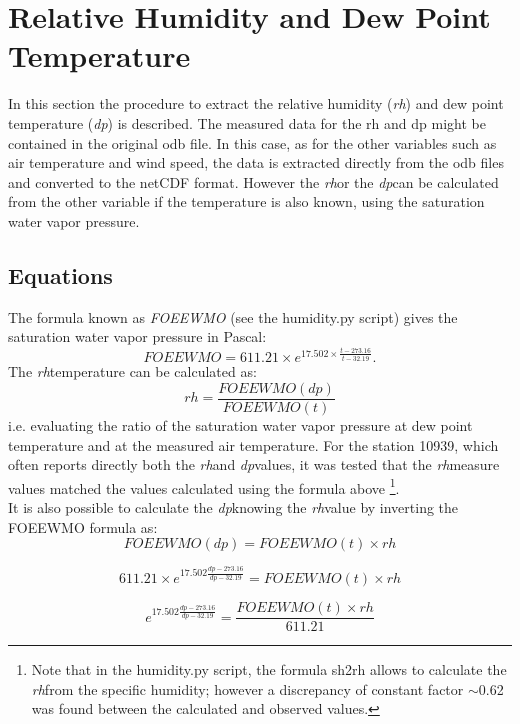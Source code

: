 \documentclass[a4paper,11pt]{article}
\newcommand{\dp}{\textit{dp}}
\newcommand{\rh}{\textit{rh}}
\begin{document}
\clearpage
\section{Relative Humidity and Dew Point Temperature}
In this section the procedure to extract the relative humidity (\rh) and dew point temperature (\dp) is described.
The measured data for the rh and dp might be contained in the original odb file. In this case, as for the other variables such as air temperature and wind speed, the data is extracted directly from the odb files and converted to the netCDF format.
However the \rh or the \dp can be calculated from the other variable if the temperature is also known, using the saturation water vapor pressure.
\subsection{Equations}
 The formula known as \textit{FOEEWMO} (see the humidity.py script) gives the saturation water vapor pressure in Pascal:
\begin{equation}
FOEEWMO = 611.21 \times e^{17.502 \times \frac{t - 273.16}{t -32.19} } .
\end{equation}
The \rh temperature can be calculated as:
\begin{equation}
rh = \frac{FOEEWMO(dp)}{FOEEWMO(t)}
\end{equation}
i.e. evaluating the ratio of the saturation water vapor pressure at dew point temperature and at the measured air temperature. For the station 10939, which often reports directly both the \rh and \dp values, it was tested that the \rh measure values matched the values calculated using the formula above \footnote{Note that in the humidity.py script, the formula sh2rh allows to calculate the \rh from the specific humidity; however a discrepancy of constant factor $\sim$0.62 was found between the calculated and observed values.}.
\\
It is also possible to calculate the \dp knowing the \rh value by inverting the FOEEWMO formula as:
\begin{equation}
FOEEWMO(dp) = FOEEWMO(t) \times rh 
\end{equation}

\begin{equation*}
611.21 \times e^{17.502 \frac{dp - 273.16}{dp-32.19}} = FOEEWMO(t) \times rh
\end{equation*}

\begin{equation*}
 e^{17.502 \frac{dp - 273.16}{dp-32.19}} =  \frac{FOEEWMO(t) \times rh}{611.21}
\end{equation*}
\end{document}
